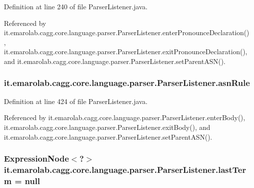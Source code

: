 Definition at line 240 of file Parser\-Listener.\-java.



Referenced by it.\-emarolab.\-cagg.\-core.\-language.\-parser.\-Parser\-Listener.\-enter\-Pronounce\-Declaration(), it.\-emarolab.\-cagg.\-core.\-language.\-parser.\-Parser\-Listener.\-exit\-Pronounce\-Declaration(), and it.\-emarolab.\-cagg.\-core.\-language.\-parser.\-Parser\-Listener.\-set\-Parent\-A\-S\-N().

\hypertarget{classit_1_1emarolab_1_1cagg_1_1core_1_1language_1_1parser_1_1ParserListener_a7465766980394c7469e9f94e2c05bd0b}{
\subsubsection[{asn\-Rule}]{ it.\-emarolab.\-cagg.\-core.\-language.\-parser.\-Parser\-Listener.\-asn\-Rule\hspace{0.3cm}{\ttfamily [private]}}}\label{classit_1_1emarolab_1_1cagg_1_1core_1_1language_1_1parser_1_1ParserListener_a7465766980394c7469e9f94e2c05bd0b}


Definition at line 424 of file Parser\-Listener.\-java.



Referenced by it.\-emarolab.\-cagg.\-core.\-language.\-parser.\-Parser\-Listener.\-enter\-Body(), it.\-emarolab.\-cagg.\-core.\-language.\-parser.\-Parser\-Listener.\-exit\-Body(), and it.\-emarolab.\-cagg.\-core.\-language.\-parser.\-Parser\-Listener.\-set\-Parent\-A\-S\-N().

\hypertarget{classit_1_1emarolab_1_1cagg_1_1core_1_1language_1_1parser_1_1ParserListener_ac7287bf5ff81d0cff238449b19bd891c}{
\subsubsection[{last\-Term}]{\setlength{\rightskip}{0pt plus 5cm}Expression\-Node$<$?$>$ it.\-emarolab.\-cagg.\-core.\-language.\-parser.\-Parser\-Listener.\-last\-Term = null\hspace{0.3cm}{\ttfamily [private]}}}\label{classit_1_1emarolab_1_1cagg_1_1core_1_1language_1_1parser_1_1ParserListener_ac7287bf5ff81d0cff238449b19bd891c}


